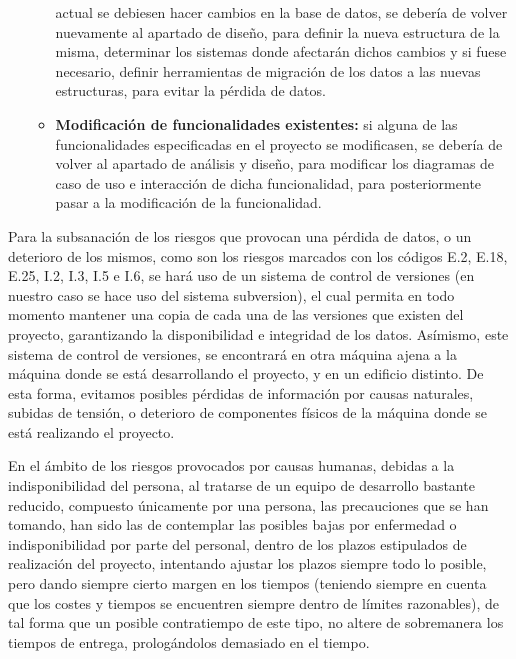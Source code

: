 \begin{itemize}
\begin{itemize}
            actual se debiesen hacer cambios en la base de datos, se debería de
            volver nuevamente al apartado de diseño, para definir la nueva
            estructura de la misma, determinar los sistemas donde afectarán
            dichos cambios y si fuese necesario, definir herramientas de
            migración de los datos a las nuevas estructuras, para evitar la
            pérdida de datos.
        \item \textbf{Modificación de funcionalidades existentes:} si alguna de
            las funcionalidades especificadas en el proyecto se modificasen, se
            debería de volver al apartado de análisis y diseño, para modificar
            los diagramas de caso de uso e interacción de dicha funcionalidad,
            para posteriormente pasar a la modificación de la funcionalidad.
    \end{itemize}
\end{itemize}

Para la subsanación de los riesgos que provocan una pérdida de datos, o un
deterioro de los mismos, como son los riesgos marcados con los códigos E.2,
E.18, E.25, I.2, I.3, I.5 e I.6, se hará uso de un sistema de control de 
versiones (en
nuestro caso se hace uso del sistema subversion), el cual permita en todo
momento mantener una copia de cada una de las versiones que existen del proyecto,
garantizando la disponibilidad e integridad de los datos. Asímismo, este
sistema de control de versiones, se encontrará en otra máquina ajena a la
máquina donde se está desarrollando el proyecto, y en un edificio distinto. De
esta forma, evitamos posibles pérdidas de información por causas naturales,
subidas de tensión, o deterioro de componentes físicos de la máquina donde se
está realizando el proyecto.

En el ámbito de los riesgos provocados por causas humanas, debidas a la
indisponibilidad del persona, al tratarse de un equipo de desarrollo bastante
reducido, compuesto únicamente por una persona, las precauciones que se han
tomando, han sido las de contemplar las posibles bajas por enfermedad o
indisponibilidad por parte del personal, dentro de los plazos estipulados de
realización del proyecto, intentando ajustar los plazos siempre todo lo posible,
pero dando siempre cierto margen en los tiempos (teniendo siempre en cuenta que
los costes y tiempos se encuentren siempre dentro de límites razonables), de tal
forma que un posible contratiempo de este tipo, no altere de sobremanera los
tiempos de entrega, prologándolos demasiado en el tiempo.

